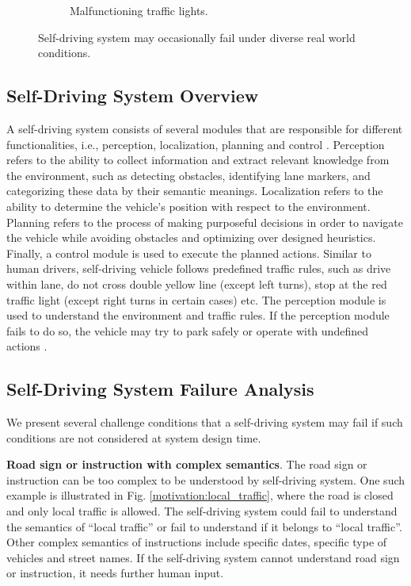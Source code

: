 \begin{figure}[ht]
\begin{subfigure}[t]{0.33\textwidth}
    \vspace{-0.2cm}
    \caption{Malfunctioning traffic lights.}
    \label{motivation:malfunction}
  \end{subfigure}%
  \vspace{-0.3cm}
  \caption{Self-driving system may occasionally fail under diverse real world conditions.}
  \label{motivation}
  \vspace{0.0cm}
\centering
\end{figure}


\subsection{Self-Driving System Overview}


A self-driving system consists of several modules that are responsible for
different functionalities, i.e.,  
perception, localization, planning and control \cite{pendleton2017perception}. 
Perception refers to the ability to collect information and extract
relevant knowledge from the environment, 
such as detecting obstacles, identifying lane markers,
and categorizing these data by their semantic meanings. 
Localization refers to the ability to determine the 
vehicle's position with respect to the environment. 
Planning refers to the process of making purposeful decisions 
in order to navigate the vehicle 
while avoiding obstacles and optimizing over designed heuristics.
Finally, a control module is used to execute the planned actions.
Similar to human drivers, self-driving vehicle follows predefined traffic rules, 
such as drive within lane, do not cross double yellow line (except left turns),
stop at the red traffic light (except right turns in certain cases) etc. 
The perception module is used to understand the environment 
and traffic rules. 
If the perception module fails to do so, the vehicle may try to park
safely or operate with undefined actions \cite{waymo}.  

\subsection{Self-Driving System Failure Analysis}
\label{sec_failure}

We present several challenge conditions that a self-driving system
may fail if such conditions are not considered at system
design time. 


\textbf{Road sign or instruction with complex semantics}. 
The road sign or instruction can be too complex to be 
understood by self-driving system. 
One such example is illustrated in Fig. \ref{motivation:local_traffic}, 
where the road is closed and only local traffic is allowed. 
The self-driving system could fail to understand 
the semantics of ``local traffic'' or
fail to understand if it belongs to ``local traffic''.
Other complex semantics of instructions include
specific dates, specific type of vehicles 
and street names. 
If the self-driving system cannot understand road sign 
or instruction, it needs further human input. 


